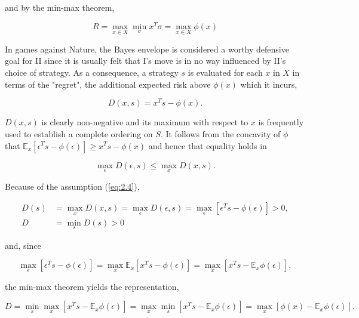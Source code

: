 \documentclass[11pt]{article}
\numberwithin{equation}{section}
\theoremstyle{boldStyle}
\begin{document}
and by the min-max theorem, 

\begin{equation} \label{eq:2.16}
    R = \max_{x \in X} \min_{\sigma} x^T \sigma = \max_{x \in X} \phi(x)
\end{equation}

\bigbreak

In games against Nature, the Bayes envelope is considered a worthy defensive goal for II since it is usually felt that I's 
move is in no way influenced by II's choice of strategy. As a consequence, a strategy \( s \) is evaluated for each 
\( x \) in \( X \) in terms of the "regret", the additional expected risk above \( \phi (x) \) which it incurs,

\begin{equation} \label{eq:2.17}
    D(x, s) = x^T s - \phi(x).
\end{equation}

\( D(x, s) \) is clearly non-negative and its maximum with respect to \( x \) is frequently used to establish a complete ordering on \( S \). 
It follows from the concavity of \( \phi \) that \( \mathbb{E}_x [\epsilon^T s - \phi(\epsilon)] \geq x^T s - \phi(x) \) and hence that equality holds in

\[
\max_{\epsilon} D(\epsilon, s) \leq \max_x D(x, s).
\]

Because of the assumption (\ref{eq:2.4}),

\begin{equation} \label{eq:2.18}
    \begin{aligned}
        D(s) &= \max_x D(x, s) = \max_{\epsilon} D(\epsilon, s) = \max_{\epsilon} [\epsilon^T s - \phi (\epsilon)] > 0, \\
        D &= \min_s D(s) > 0
    \end{aligned}
\end{equation}


and, since

\[
\max_{\epsilon} [\epsilon^T s - \phi (\epsilon)] = \max_x \mathbb{E}_x [x^T s - \phi(\epsilon)] = \max_x [x^T s - \mathbb{E}_x \phi (\epsilon)],
\]

the min-max theorem yields the representation,

\begin{purplebox}
    \begin{equation} \label{eq:2.19}
        D = \min_s \max_x [x^T s - \mathbb{E}_x \phi (\epsilon)] = \max_x \min_s [x^T s - \mathbb{E}_x \phi (\epsilon)] = \max_x [\phi (x) - \mathbb{E}_x \phi (\epsilon)].    
    \end{equation}
\end{purplebox}
\end{document}
